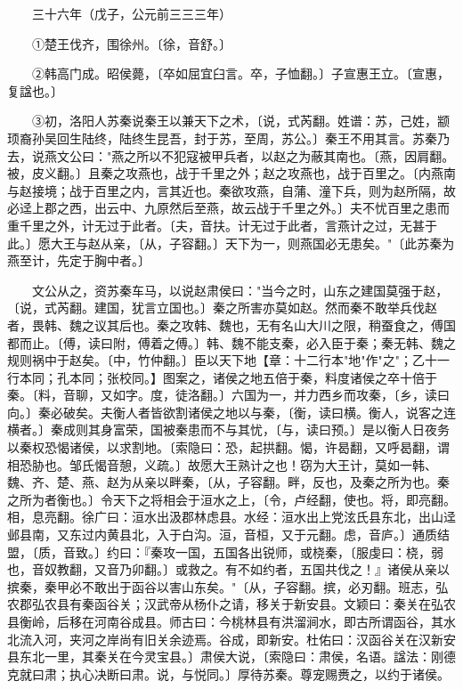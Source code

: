 　　三十六年（戊子，公元前三三三年）

　　①楚王伐齐，围徐州。〔徐，音舒。〕

　　②韩高门成。昭侯薨，〔卒如屈宜臼言。卒，子恤翻。〕子宣惠王立。〔宣惠，复諡也。〕

　　③初，洛阳人苏秦说秦王以兼天下之术，〔说，式芮翻。姓谱：苏，己姓，颛顼裔孙吴回生陆终，陆终生昆吾，封于苏，至周，苏公。〕秦王不用其言。苏秦乃去，说燕文公曰："燕之所以不犯寇被甲兵者，以赵之为蔽其南也。〔燕，因肩翻。被，皮义翻。〕且秦之攻燕也，战于千里之外；赵之攻燕也，战于百里之。〔内燕南与赵接境；战于百里之内，言其近也。秦欲攻燕，自蒲、潼下兵，则为赵所隔，故必迳上郡之西，出云中、九原然后至燕，故云战于千里之外。〕夫不忧百里之患而重千里之外，计无过于此者。〔夫，音扶。计无过于此者，言燕计之过，无甚于此。〕愿大王与赵从亲，〔从，子容翻。〕天下为一，则燕国必无患矣。"〔此苏秦为燕至计，先定于胸中者。〕

　　文公从之，资苏秦车马，以说赵肃侯曰："当今之时，山东之建国莫强于赵，〔说，式芮翻。建国，犹言立国也。〕秦之所害亦莫如赵。然而秦不敢举兵伐赵者，畏韩、魏之议其后也。秦之攻韩、魏也，无有名山大川之限，稍蚕食之，傅国都而止。〔傅，读曰附，傅着之傅。〕韩、魏不能支秦，必入臣于秦；秦无韩、魏之规则祸中于赵矣。〔中，竹仲翻。〕臣以天下地【章：十二行本"地"作"之"；乙十一行本同；孔本同；张校同。】图案之，诸侯之地五倍于秦，料度诸侯之卒十倍于秦。〔料，音聊，又如字。度，徒洛翻。〕六国为一，并力西乡而攻秦，〔乡，读曰向。〕秦必破矣。夫衡人者皆欲割诸侯之地以与秦，〔衡，读曰横。衡人，说客之连横者。〕秦成则其身富荣，国被秦患而不与其忧，〔与，读曰预。〕是以衡人日夜务以秦权恐愒诸侯，以求割地。〔索隐曰：恐，起拱翻。愒，许曷翻，又呼曷翻，谓相恐胁也。邹氏愒音憩，义疏。〕故愿大王熟计之也！窃为大王计，莫如一韩、魏、齐、楚、燕、赵为从亲以畔秦，〔从，子容翻。畔，反也，及秦之所为也。秦之所为者衡也。〕令天下之将相会于洹水之上，〔令，卢经翻，使也。将，即亮翻。相，息亮翻。徐广曰：洹水出汲郡林虑县。水经：洹水出上党泫氏县东北，出山迳邺县南，又东过内黄县北，入于白沟。洹，音桓，又于元翻。虑，音庐。〕通质结盟，〔质，音致。〕约曰：『秦攻一国，五国各出锐师，或桡秦，〔服虔曰：桡，弱也，音奴教翻，又音乃卯翻。〕或救之。有不如约者，五国共伐之！』诸侯从亲以摈秦，秦甲必不敢出于函谷以害山东矣。"〔从，子容翻。摈，必刃翻。班志，弘农郡弘农县有秦函谷关；汉武帝从杨仆之请，移关于新安县。文颖曰：秦关在弘农县衡岭，后移在河南谷成县。师古曰：今桃林县有洪溜涧水，即古所谓函谷，其水北流入河，夹河之岸尚有旧关余迹焉。谷成，即新安。杜佑曰：汉函谷关在汉新安县东北一里，其秦关在今灵宝县。〕肃侯大说，〔索隐曰：肃侯，名语。諡法：刚德克就曰肃；执心决断曰肃。说，与悦同。〕厚待苏秦。尊宠赐赉之，以约于诸侯。

